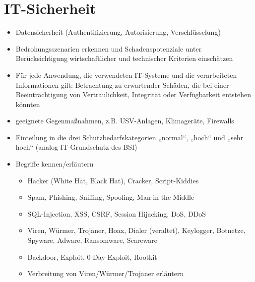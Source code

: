 \section{IT-Sicherheit}
\label{sec:IT-Sicherheit}

\begin{itemize}
	\item Datensicherheit (Authentifizierung, Autorisierung, Verschlüsselung)
	\item Bedrohungsszenarien erkennen und Schadenspotenziale unter Berücksichtigung wirtschaftlicher und technischer Kriterien einschätzen
	\item Für jede Anwendung, die verwendeten IT-Systeme und die verarbeiteten Informationen gilt: Betrachtung zu erwartender Schäden, die bei einer Beeinträchtigung von Vertraulichkeit, Integrität oder Verfügbarkeit entstehen könnten
	\item geeignete Gegenmaßnahmen, z.B. USV-Anlagen, Klimageräte, Firewalls
	\item Einteilung in die drei Schutzbedarfskategorien „normal“, „hoch“ und „sehr hoch“ (analog IT-Grundschutz des BSI)
	\item Begriffe kennen/erläutern
	\begin{itemize}
		\item Hacker (White Hat, Black Hat), Cracker, Script-Kiddies
		\item Spam, Phishing, Sniffing, Spoofing, Man-in-the-Middle
		\item SQL-Injection, XSS, CSRF, Session Hijacking, DoS, DDoS
		\item Viren, Würmer, Trojaner, Hoax, Dialer (veraltet), Keylogger, Botnetze, Spyware, Adware, Ransomware, Scareware
		\item Backdoor, Exploit, 0-Day-Exploit, Rootkit
		\item Verbreitung von Viren/Würmer/Trojaner erläutern
	\end{itemize}
	
\end{itemize}